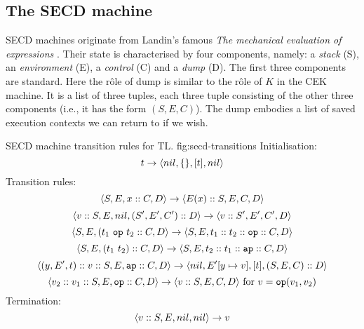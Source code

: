 \documentclass[class=article, crop=false]{standalone}
\begin{document}
\subsection{The SECD machine}

SECD machines originate from Landin's famous
\emph{The mechanical evaluation of expressions} \cite{landin-secd}. Their state
is characterised by four components, namely: a \emph{stack} (S),
an \emph{environment} (E), a \emph{control} (C) and a \emph{dump} (D). The first
three components are standard. Here the rôle of dump is similar to the rôle of
$K$ in the CEK machine. It is a list of three tuples, each three tuple consisting
of the other three components (i.e., it has the form $(S, E, C)$). The dump
embodies a list of saved execution contexts we can return to if we wish.

\begin{myfigure}
{SECD machine transition rules for TL.}
{fig:secd-transitions}
Initialisation:
$$ t \to \langle nil, \{\}, [t], nil \rangle $$
%
Transition rules:
$$ \langle S, E, x :: C, D \rangle \to \langle E(x) :: S, E, C, D \rangle $$
$$ \langle v :: S, E, nil, (S', E', C') :: D \rangle \to \langle v :: S', E', C', D \rangle $$
$$ \langle S, E, (t_1\ \mathtt{op}\ t_2 :: C, D \rangle \to \langle S, E, t_1 :: t_2 :: \mathtt{op} :: C, D \rangle $$
$$ \langle S, E, (t_1\ t_2) :: C, D \rangle \to \langle S, E, t_2 :: t_1 :: \mathtt{ap} :: C, D \rangle $$
$$ \langle (y, E', t) :: v :: S, E, \mathtt{ap} :: C, D \rangle \to \langle nil, E'[y \mapsto v], [t], (S, E, C) :: D \rangle $$
$$ \langle v_2 :: v_1 :: S, E, \mathtt{op} :: C, D \rangle \to \langle v :: S, E, C, D \rangle \text{ for } v = \mathtt{op}(v_1, v_2) $$
%
Termination:
$$ \langle v :: S, E, nil, nil \rangle \to v $$
\end{myfigure}
\end{document}
